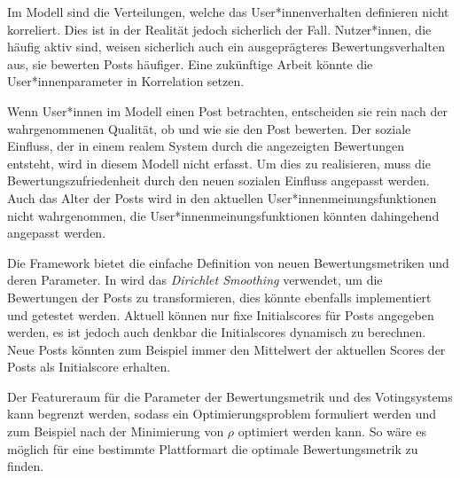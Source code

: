Im Modell sind die Verteilungen, welche das User*innenverhalten definieren nicht korreliert. Dies ist in der Realität jedoch sicherlich der Fall. Nutzer*innen, die häufig aktiv sind, weisen sicherlich auch ein ausgeprägteres Bewertungsverhalten aus, sie bewerten Posts häufiger. Eine zukünftige Arbeit könnte die User*innenparameter in Korrelation setzen.

Wenn User*innen im Modell einen Post betrachten, entscheiden sie rein nach der wahrgenommenen Qualität, ob und wie sie den Post bewerten. Der soziale Einfluss, der in einem realem System durch die angezeigten Bewertungen entsteht, wird in diesem Modell nicht erfasst. Um dies zu realisieren, muss die Bewertungszufriedenheit durch den neuen sozialen Einfluss angepasst werden. Auch das Alter der Posts wird in den aktuellen User*innenmeinungsfunktionen nicht wahrgenommen, die User*innenmeinungsfunktionen könnten dahingehend angepasst werden.


Die Framework bietet die einfache Definition von neuen Bewertungsmetriken und deren Parameter. In \cite{dietze} wird das \textit{Dirichlet Smoothing} verwendet, um die Bewertungen der Posts zu transformieren, dies könnte ebenfalls implementiert und getestet werden. Aktuell können nur fixe Initialscores für Posts angegeben werden, es ist jedoch auch denkbar die Initialscores dynamisch zu berechnen. Neue Posts könnten zum Beispiel immer den Mittelwert der aktuellen Scores der Posts als Initialscore erhalten.

Der Featureraum für die Parameter der Bewertungsmetrik und des Votingsystems kann begrenzt werden, sodass ein Optimierungsproblem formuliert werden und zum Beispiel nach der Minimierung von $\rho$ optimiert werden kann. So wäre es möglich für eine bestimmte Plattformart die optimale Bewertungsmetrik zu finden.